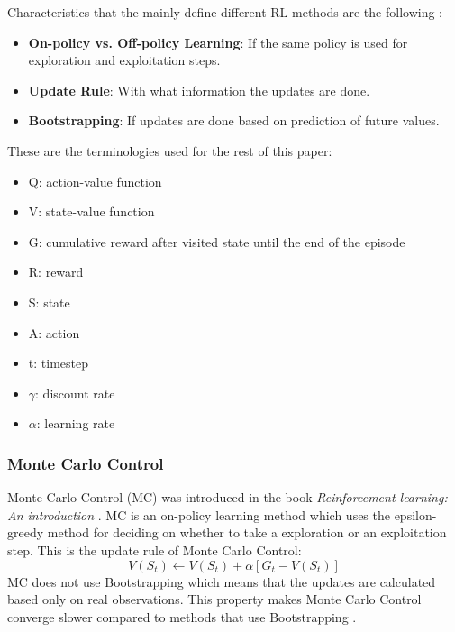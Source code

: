 \documentclass[conference]{IEEEtran}
\begin{document}
Characteristics that the mainly define different RL-methods are the following \cite{b4}:
\begin{itemize}
	\item \textbf{On-policy vs. Off-policy Learning}: If the same policy is used for exploration and exploitation steps. 
	\item \textbf{Update Rule}: With what information the updates are done. 
	\item \textbf{Bootstrapping}: If updates are done based on prediction of future values. 
\end{itemize}

These are the terminologies used for the rest of this paper: 
\begin{itemize}
	\item Q: action-value function
	\item V: state-value function
	\item G: cumulative reward after visited state until the end of the episode 
	\item R: reward
	\item S: state
	\item A: action
	\item t: timestep
	\item $\gamma$: discount rate
	\item $\alpha$: learning rate
\end{itemize}

\subsubsection{Monte Carlo Control}
Monte Carlo Control (MC) was introduced in the book \textit{Reinforcement learning: An introduction} \cite{b4}.
MC is an on-policy learning method which uses the epsilon-greedy method for deciding on whether to take a exploration or an exploitation step.
This is the update rule of Monte Carlo Control:
\begin{equation*}
	V(S_t) \leftarrow V(S_t) + \alpha [G_t - V(S_t)] \tag{1}
\end{equation*}
MC does not use Bootstrapping which means that the updates are calculated based only on real observations. 
This property makes Monte Carlo Control converge slower compared to methods that use Bootstrapping \cite{b4}.  
\end{document}
